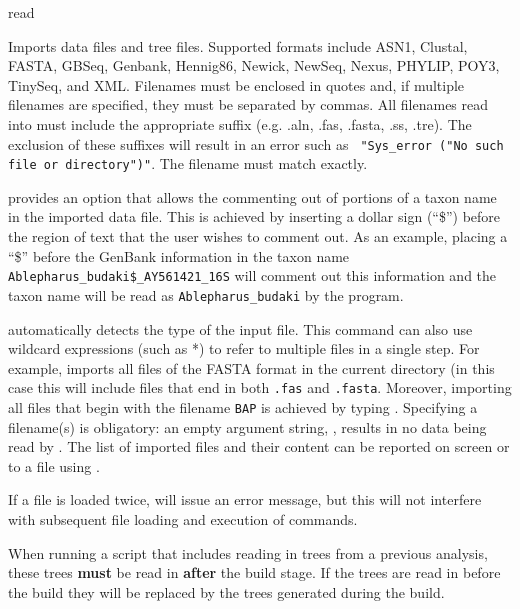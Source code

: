 
\begin{command}{read}{}


\begin{poydescription} 
Imports data files and tree files. Supported formats include ASN1, Clustal, FASTA,
GBSeq, Genbank, Hennig86, Newick, NewSeq, Nexus, PHYLIP, POY3,
TinySeq, and XML. Filenames must be enclosed in quotes and, if multiple
filenames are specified, they must be separated by commas. All filenames 
read into \poy must include the appropriate suffix (e.g. .aln, .fas, 
.fasta, .ss, .tre). The exclusion of these suffixes will result in an error such as \texttt{
"Sys\_error ("No such file or directory")"}. The filename must match exactly.

\begin{statement}
\poy provides an option that allows the commenting out of portions of a taxon name 
in the imported data file. This is achieved by inserting a dollar sign (``\$'') before the region 
of text that the user wishes to comment out. As an example, placing a ``\$'' before the 
GenBank information in the taxon name \texttt{Ablepharus\_budaki\$\_AY561421\_16S} 
will comment out this information and the taxon name will be read as 
\texttt{Ablepharus\_budaki} by the program.
\end{statement}

 automatically detects the type of the 
input file. This command can also use wildcard expressions (such as *) to
refer to multiple files in a single step. For example,  
imports all files of the FASTA format in the current directory (in this case 
this will include files that end in both \texttt{.fas} and \texttt{.fasta}. Moreover, 
importing all files that begin with the filename \texttt{BAP} is achieved by typing 
. Specifying a filename(s) is obligatory: 
an empty argument string, , results in no data being 
read by \poy. The list of imported files and their content
can be reported on screen or to a file using .

If a file is loaded twice, \poy will issue an error message, but this will not
interfere with subsequent file loading and execution of commands.

\begin{statement}
When running a script that includes reading in trees from a previous analysis, 
these trees {\bf must} be read in {\bf after} the build stage. If the trees are read 
in before the build they will be replaced by the trees generated during the build.
\end{statement}


\end{poydescription}
\end{command}
